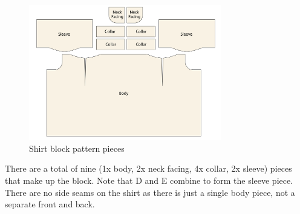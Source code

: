 \begin{figure} [H] %
    \centering %
    \includegraphics[width = 0.75\textwidth]{Images/originalpattern_pieces.png} %
    \caption{Shirt block pattern pieces}
\end{figure}
There are a total of nine (1x body, 2x neck facing, 4x collar, 2x sleeve) pieces that make up the block. Note that D and E combine to form the sleeve piece. There are no side seams on the shirt as there is just a single body piece, not a separate front and back.

